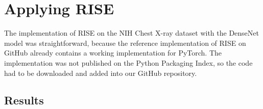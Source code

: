 \clearpage

\section{Applying RISE}

The implementation of RISE on the NIH Chest X-ray dataset with the DenseNet model was straightforward, because the reference implementation of RISE on GitHub \cite{risegithub} already contains a working implementation for PyTorch. The implementation was not published on the Python Packaging Index, so the code had to be downloaded and added into our GitHub repository.

\subsection{Results}

